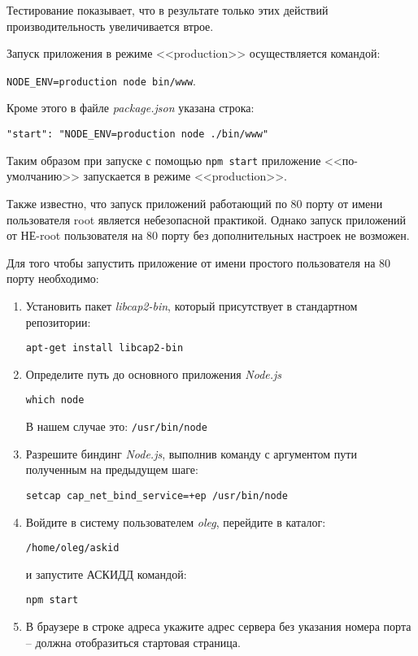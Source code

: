 Тестирование показывает, что в результате только этих действий производительность увеличивается втрое.

Запуск приложения в режиме <<production>> осуществляется командой:

\verb|NODE_ENV=production node bin/www|.

Кроме этого в файле \textit{package.json} указана строка:

\verb|"start": "NODE_ENV=production node ./bin/www"|

Таким образом при запуске с помощью \verb|npm start| приложение <<по-умолча\-нию>> запускается в режиме <<production>>.

Также известно, что запуск приложений работающий по 80 порту от имени пользователя root является небезопасной практикой. Однако запуск приложений от НЕ-root пользователя на 80 порту без дополнительных настроек не возможен.

Для того чтобы запустить приложение от имени простого пользователя на 80 порту необходимо:

\begin{enumerate}
	
	\item Установить пакет \textit{libcap2-bin}, который присутствует в стандартном репозитории:
	
		\verb|apt-get install libcap2-bin|
		
	\item Определите путь до основного приложения \textit{Node.js}
	
		\verb|which node|
		
	В нашем случае это: \verb|/usr/bin/node|
		
	\item Разрешите биндинг \textit{Node.js},  выполнив команду с аргументом пути полученным на предыдущем шаге:
	
		\verb|setcap cap_net_bind_service=+ep /usr/bin/node|
		
	\item Войдите в систему пользователем \textit{oleg}, перейдите в каталог:
	
	\verb|/home/oleg/askid| 
	
	и запустите АСКИДД командой:
	
		\verb|npm start|
		
	\item В браузере в строке адреса укажите адрес сервера без указания номера порта -- должна отобразиться стартовая страница.
\end{enumerate}		
